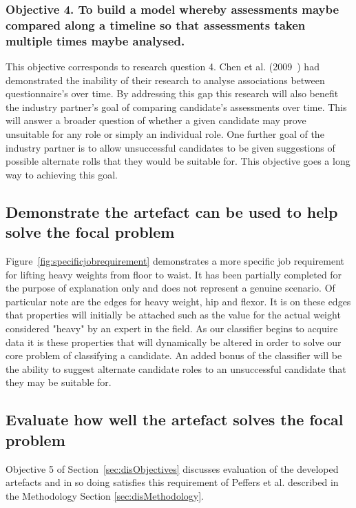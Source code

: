 \subsubsection{Objective 4. To build a model whereby assessments maybe compared along a timeline so that assessments taken multiple times maybe analysed.}

This objective corresponds to research question 4. Chen et al. (2009~\cite{chen2009mining}) had demonstrated the inability of their research to analyse associations between questionnaire's over time. By addressing this gap this research will also benefit the industry partner's goal of comparing candidate's assessments over time. This will answer a broader question of whether a given candidate may prove unsuitable for any role or simply an individual role. One further goal of the industry partner is to allow unsuccessful candidates to be given suggestions of possible alternate rolls that they would be suitable for. This objective goes a long way to achieving this goal.


\subsection{Demonstrate the artefact can be used to help solve the focal problem}

Figure~\ref{fig:specificjobrequirement} demonstrates a more specific job requirement for lifting heavy weights from floor
to waist. It has been partially completed for the purpose of explanation only and does not represent a genuine scenario.
Of particular note are the edges for heavy weight,
hip and flexor. It is on these edges that properties will initially be attached such as the value for the actual weight
considered "heavy" by an expert in the field. As our classifier begins to acquire data it is these properties that will
dynamically be altered in order to solve our core problem of classifying a candidate. An added bonus of the classifier
will be the ability to suggest alternate candidate roles to an unsuccessful candidate that they may be suitable for.




\subsection{Evaluate how well the artefact solves the focal problem}

Objective 5 of Section~\ref{sec:disObjectives} discusses evaluation of the developed artefacts and in so doing satisfies
this requirement of Peffers et al. described in the Methodology Section \ref{sec:disMethodology}.

